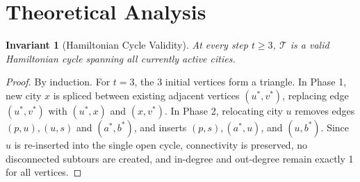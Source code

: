 \documentclass{article}
\newtheorem{invariant}{Invariant}
\theoremstyle{definition}
\begin{document}
\section{Theoretical Analysis}

\begin{invariant}[Hamiltonian Cycle Validity]
At every step $t \ge 3$, $\mathcal{T}$ is a valid Hamiltonian cycle spanning all currently active cities.
\end{invariant}
\begin{proof}
By induction. For $t=3$, the 3 initial vertices form a triangle. In Phase 1, new city $x$ is spliced between existing adjacent vertices $(u^*, v^*)$, replacing edge $(u^*, v^*)$ with $(u^*, x)$ and $(x, v^*)$. In Phase 2, relocating city $u$ removes edges $(p, u), (u, s)$ and $(a^*, b^*)$, and inserts $(p, s), (a^*, u)$, and $(u, b^*)$. Since $u$ is re-inserted into the single open cycle, connectivity is preserved, no disconnected subtours are created, and in-degree and out-degree remain exactly 1 for all vertices.
\end{proof}
\end{document}
